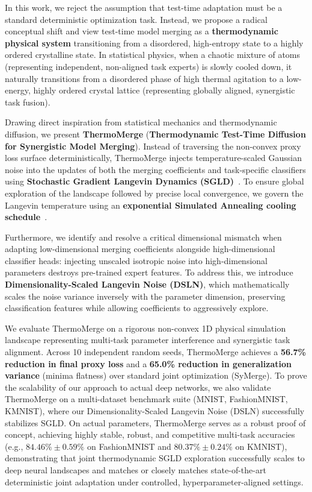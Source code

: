 In this work, we reject the assumption that test-time adaptation must be a standard deterministic optimization task.
Instead, we propose a radical conceptual shift and view test-time model merging as a \textbf{thermodynamic physical system} transitioning from a disordered, high-entropy state to a highly ordered crystalline state.
In statistical physics, when a chaotic mixture of atoms (representing independent, non-aligned task experts) is slowly cooled down, it naturally transitions from a disordered phase of high thermal agitation to a low-energy, highly ordered crystal lattice (representing globally aligned, synergistic task fusion).

Drawing direct inspiration from statistical mechanics and thermodynamic diffusion, we present \textbf{ThermoMerge} (\textbf{Thermodynamic Test-Time Diffusion for Synergistic Model Merging}).
Instead of traversing the non-convex proxy loss surface deterministically, ThermoMerge injects temperature-scaled Gaussian noise into the updates of both the merging coefficients and task-specific classifiers using \textbf{Stochastic Gradient Langevin Dynamics (SGLD)}~\cite{welling2011bayesian}.
To ensure global exploration of the landscape followed by precise local convergence, we govern the Langevin temperature using an \textbf{exponential Simulated Annealing cooling schedule}~\cite{kirkpatrick1983optimization}.

Furthermore, we identify and resolve a critical dimensional mismatch when adapting low-dimensional merging coefficients alongside high-dimensional classifier heads: injecting unscaled isotropic noise into high-dimensional parameters destroys pre-trained expert features.
To address this, we introduce \textbf{Dimensionality-Scaled Langevin Noise (DSLN)}, which mathematically scales the noise variance inversely with the parameter dimension, preserving classification features while allowing coefficients to aggressively explore.

We evaluate ThermoMerge on a rigorous non-convex 1D physical simulation landscape representing multi-task parameter interference and synergistic task alignment.
Across 10 independent random seeds, ThermoMerge achieves a \textbf{56.7\% reduction in final proxy loss} and a \textbf{65.0\% reduction in generalization variance} (minima flatness) over standard joint optimization (SyMerge).
To prove the scalability of our approach to actual deep networks, we also validate ThermoMerge on a multi-dataset benchmark suite (MNIST, FashionMNIST, KMNIST), where our Dimensionality-Scaled Langevin Noise (DSLN) successfully stabilizes SGLD.
On actual parameters, ThermoMerge serves as a robust proof of concept, achieving highly stable, robust, and competitive multi-task accuracies (e.g., $84.46\% \pm 0.59\%$ on FashionMNIST and $80.37\% \pm 0.24\%$ on KMNIST), demonstrating that joint thermodynamic SGLD exploration successfully scales to deep neural landscapes and matches or closely matches state-of-the-art deterministic joint adaptation under controlled, hyperparameter-aligned settings.

